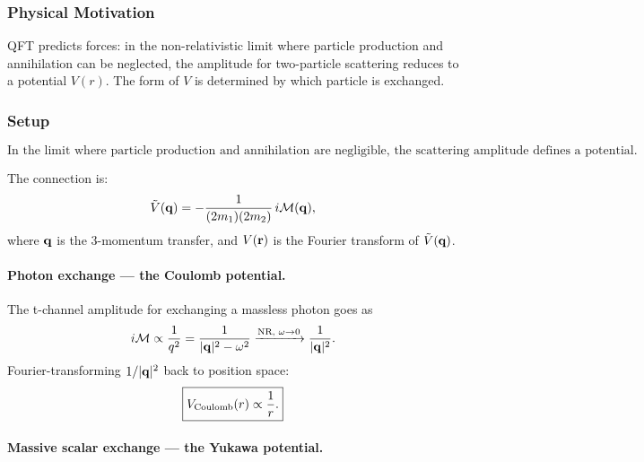 \documentclass[../main.tex]{subfiles}
\begin{document}
\subsubsection*{Physical Motivation}

QFT predicts forces: in the non-relativistic limit where particle production and annihilation can be neglected, the amplitude for two-particle scattering reduces to a potential $V(r)$.  The form of $V$ is determined by which particle is exchanged.

\subsubsection*{Setup}

\begin{equation}
  \boxed{
  \text{In the limit where particle production and annihilation are negligible,}
  \text{ the scattering amplitude defines a potential.}}
  \label{eq:lec12:potlimit}
\end{equation}

The connection is:
\begin{equation}
  \tilde{V}(\mathbf{q})
  = -\frac{1}{(2m_1)(2m_2)}\,i\mathcal{M}(\mathbf{q}),
  \label{eq:lec12:vtilde}
\end{equation}
where $\mathbf{q}$ is the 3-momentum transfer, and $V(\mathbf{r})$ is the Fourier transform of $\tilde{V}(\mathbf{q})$.

\paragraph{Photon exchange — the Coulomb potential.}

The t-channel amplitude for exchanging a massless photon goes as
\begin{equation}
  i\mathcal{M} \propto \frac{1}{q^2} = \frac{1}{|\mathbf{q}|^2 - \omega^2}
  \xrightarrow{\text{NR, }\omega\to 0} \frac{1}{|\mathbf{q}|^2}.
  \label{eq:lec12:photonamp}
\end{equation}
Fourier-transforming $1/|\mathbf{q}|^2$ back to position space:
\begin{equation}
  \boxed{V_{\rm Coulomb}(r) \propto \frac{1}{r}.}
  \label{eq:lec12:coulomb}
\end{equation}

\paragraph{Massive scalar exchange — the Yukawa potential.}
\end{document}
